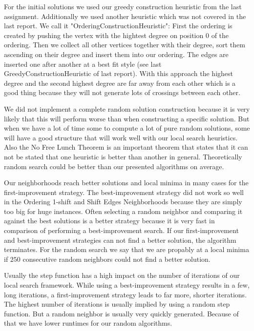 \documentclass[11pt]{article}
\begin{document}
For the initial solutions we used our greedy construction heuristic from the last assignment.
Additionally we used another heuristic which was not covered in the last report. We call it "OrderingConstructionHeuristic":
First the ordering is created by pushing the vertex with the hightest degree on position $0$ of the ordering.
Then we collect all other vertices together with their degree, sort them ascending on their degree and insert them into our ordering.
The edges are inserted one after another at a best fit style (see last GreedyConstructionHeuristic of last report).
With this approach the highest degree and the second highest degree are far away from each other which is a good thing because they will not generate lots of crossings between each other.

We did not implement a complete random solution construction because it is very likely that this will perform worse than when constructing a specific solution.
But when we have a lot of time some to compute a lot of pure random solutions, some will have a good structure that will work well with our local search heuristics.
Also the No Free Lunch Theorem is an important theorem that states that it can not be stated that one heuristic is better than another in general.
Theoretically random search could be better than our presented algorithms on average.

Our neighborhoods reach better solutions and local minima in many cases for the first-improvement strategy.
The best-improvement strategy did not work so well in the Ordering 1-shift and Shift Edges Neighborhoods because they are simply too big for huge instances.
Often selecting a random neighbor and comparing it against the best solutions is a better strategy because it is very fast in comparison of performing a best-improvement search.
If our first-improvement and best-improvement strategies can not find a better solution, the algorithm terminates.
For the random search we say that we are propably at a local minima if $250$ consecutive random neighbors could not find a better solution.

Usually the step function has a high impact on the number of iterations of our local search framework.
While using a best-improvement strategy results in a few, long iterations, a first-improvement strategy leads to far more, shorter iterations.
The highest number of iterations is usually implied by using a random step function.
But a random neighbor is usually very quickly generated. Because of that we have lower runtimes for our random algorithms.
\end{document}
